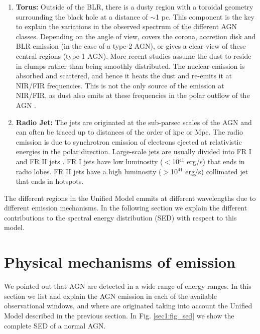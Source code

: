 \begin{enumerate}
\item \textbf{Torus:}  Outside of the BLR, there is a dusty region with a toroidal geometry surrounding the black hole at a distance of $\sim$1 pc. This component is the key to explain the variations in the observed spectrum of the different AGN classes. Depending on the angle of view, covers the corona, accretion disk and BLR emission (in the case of a type-2 AGN), or gives a clear view of these central regions (type-1 AGN). More recent studies assume the dust to reside in clumps rather than being smoothly distributed. The nuclear emission is absorbed and scattered, and hence it heats the dust and re-emits it at NIR/FIR frequencies. This is not the only source of the emission at NIR/FIR, as dust also emits at these frequencies in the polar outflow of the AGN \citep{honig17}. 

\item \textbf{Radio Jet:} The jets are originated at the sub-parsec scales of the AGN and can often be traced up to distances of the order of kpc or Mpc. The radio emission is due to synchrotron emission of electrons ejected at relativistic energies in the polar direction. Large-scale jets are usually divided into FR I and FR II jets \citep{fanaroff74}. FR I jets have low luminosity ($<$10$^{41}$ erg/s) that ends in radio lobes. FR II jets have a high luminosity ($>$10$^{41}$ erg/s) collimated jet that ends in hotspots.


\end{enumerate}

The different regions in the Unified Model emmits at different wavelengths due to different emission mechanisms. In the following section we explain the different contributions to the spectral energy distribution (SED) with respect to this model.




\section{Physical mechanisms of emission}
\label{sec1:em}

We pointed out that AGN are detected in a wide range of energy ranges. In this section we list and explain the AGN emission in each of the available observational windows, and where are originated taking into account the Unified Model described in the previous section. In Fig. \ref{sec1:fig_sed} we show the complete SED of a normal AGN.



